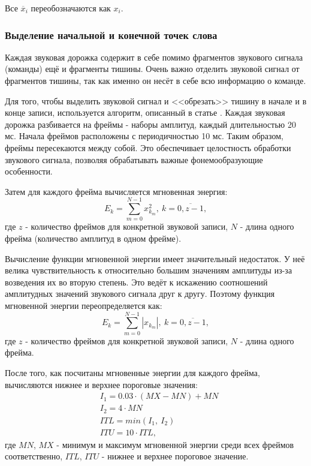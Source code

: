 Все $\overline{x}_i$ переобозначаются как $x_i$.

\subsubsection{Выделение начальной и конечной точек слова}
Каждая звуковая дорожка содержит в себе помимо фрагментов звукового сигнала (команды) ещё и фрагменты тишины. Очень важно отделить звуковой сигнал от фрагментов тишины, так как именно он несёт в себе всю информацию о команде. 

Для того, чтобы выделить звуковой сигнал и <<обрезать>> тишину в начале и в конце записи, используется алгоритм, описанный в статье \cite{SignalPreprocessing}. 
Каждая звуковая дорожка разбивается на фреймы - наборы амплитуд, каждый длительностью 20 мс. Начала фреймов расположены с периодичностью 10 мс. Таким образом, фреймы пересекаются между собой. Это обеспечивает целостность обработки звукового сигнала, позволяя обрабатывать важные фонемообразующие особенности.

Затем для каждого фрейма вычисляется мгновенная энергия:
\begin{equation}
E_k = \sum_{m=0}^{N-1} x_{k_m}^2,~k=\overline{0,z-1},
\end{equation}
где $z$ - количество фреймов для конкретной звуковой записи, $N$ - длина одного фрейма (количество амплитуд в одном фрейме).

Вычисление функции мгновенной энергии имеет значительный недостаток. У неё велика чувствительность к относительно большим значениям амплитуды из-за возведения их во вторую степень. Это ведёт к искажению соотношений амплитудных значений звукового сигнала друг к другу. Поэтому функция мгновенной энергии переопределяется как:
\begin{equation}
\label{eq:instant_energy}
E_k = \sum_{m=0}^{N-1} |x_{k_m}|,~k=\overline{0,z-1},
\end{equation}
где $z$ - количество фреймов для конкретной звуковой записи, $N$ - длина одного фрейма.

После того, как посчитаны мгновенные энергии для каждого фрейма, вычисляются нижнее и верхнее пороговые значения:
\begin{equation}
\begin{aligned}
& I_1 = 0.03 \cdot (MX - MN) + MN \\
& I_2 = 4 \cdot MN \\
& ITL = min(I_1,~I_2)\\
& ITU = 10 \cdot ITL,
\end{aligned}
\end{equation}
где $MN$, $MX$ - минимум и максимум мгновенной энергии среди всех фреймов соответственно, $ITL$, $ITU$ - нижнее и верхнее пороговое значение.

